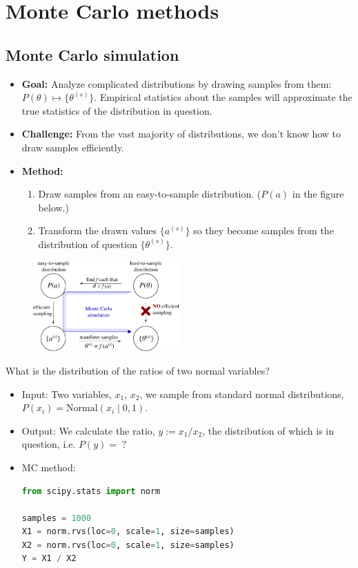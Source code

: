 \clearpage
\section{Monte Carlo methods}

\subsection{Monte Carlo simulation}
\begin{itemize}
	\item {\bf Goal:} Analyze complicated distributions by drawing samples from them: $P(\theta) \mapsto \{\theta^{(s)}\}$. Empirical statistics about the samples will approximate the true statistics of the distribution in question.
	\item {\bf Challenge:} From the vast majority of distributions, we don't know how to draw samples efficiently.
	\item {\bf Method:} 
	\begin{enumerate}
		\item Draw samples from an easy-to-sample distribution. ($P(a)$ in the figure below.)
		\item Transform the drawn values $\{a^{(s)}\}$ so they become samples from the distribution of question $\{\theta^{(s)}\}$.
	\end{enumerate}
\end{itemize}
\begin{figure}[h]
\centering
\includegraphics[width=0.5\textwidth]{./figs/07-MC.pdf}
\end{figure}


 What is the distribution of the ratios of two normal variables?
\begin{itemize}
	\item Input: Two variables, $x_1$, $x_2$, we sample from standard normal distributions, $P(x_i) = \text{Normal}(x_i\;|\;0, 1)$.
	\item Output: We calculate the ratio, $y := x_1 / x_2$, the distribution of which is in question, i.e. $P(y) = \;?$
	\item MC method:
\begin{lstlisting}[language=python]
from scipy.stats import norm

samples = 1000
X1 = norm.rvs(loc=0, scale=1, size=samples)
X2 = norm.rvs(loc=0, scale=1, size=samples)
Y = X1 / X2
\end{lstlisting}

\end{itemize}

